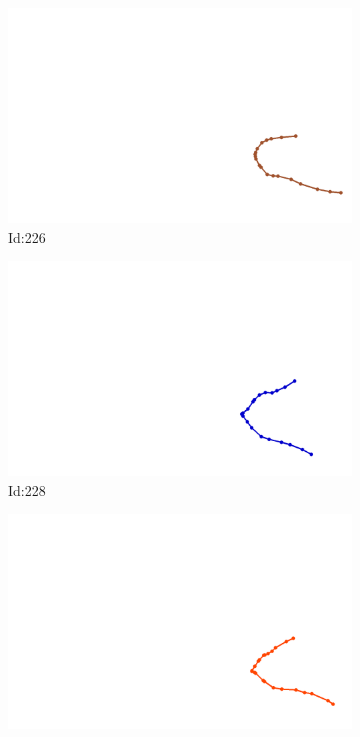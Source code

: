 \documentclass[12pt,twoside]{report}
\begin{document}
\begin{figure}
\centering
\begin{subfigure}[b]{0.20\textwidth}
\centering
\includegraphics[width=\textwidth]{../../trajectories/226.png}
\caption{Id:226}
\end{subfigure}
\begin{subfigure}[b]{0.20\textwidth}
\centering
\includegraphics[width=\textwidth]{../../trajectories/228.png}
\caption{Id:228}
\end{subfigure}
\begin{subfigure}[b]{0.20\textwidth}
\centering
\includegraphics[width=\textwidth]{../../trajectories/716.png}

\end{subfigure}
\end{figure}
\end{document}
